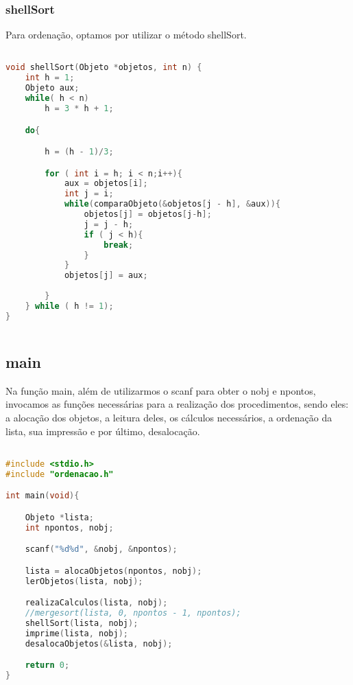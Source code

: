 \documentclass{article}
\begin{document}
\subsubsection{shellSort}

Para ordenação, optamos por utilizar o método shellSort.

\begin{lstlisting}[caption={Função shellSort},label={lst:cod7},language=C]

void shellSort(Objeto *objetos, int n) {
    int h = 1;
    Objeto aux;
    while( h < n)
        h = 3 * h + 1;

    do{

        h = (h - 1)/3;

        for ( int i = h; i < n;i++){
            aux = objetos[i]; 
            int j = i;
            while(comparaObjeto(&objetos[j - h], &aux)){
                objetos[j] = objetos[j-h];
                j = j - h;
                if ( j < h){
                    break;
                }
            }
            objetos[j] = aux;
            
        }
    } while ( h != 1); 
}
    
\end{lstlisting}



\clearpage
\subsection{main}

Na função main, além de utilizarmos o scanf para obter o nobj e npontos, invocamos as funções necessárias para a realização dos procedimentos, sendo eles: a alocação dos objetos, a leitura deles, os cálculos necessários, a ordenação da lista, sua impressão e por último, desalocação.

\begin{lstlisting}[caption={função main},label={lst:cod11},language=C]

#include <stdio.h>
#include "ordenacao.h"

int main(void){

    Objeto *lista;
    int npontos, nobj;

    scanf("%d%d", &nobj, &npontos);

    lista = alocaObjetos(npontos, nobj);
    lerObjetos(lista, nobj);

    realizaCalculos(lista, nobj);
    //mergesort(lista, 0, npontos - 1, npontos);
    shellSort(lista, nobj);
    imprime(lista, nobj);
    desalocaObjetos(&lista, nobj);

    return 0;
}

\end{lstlisting}
\end{document}
